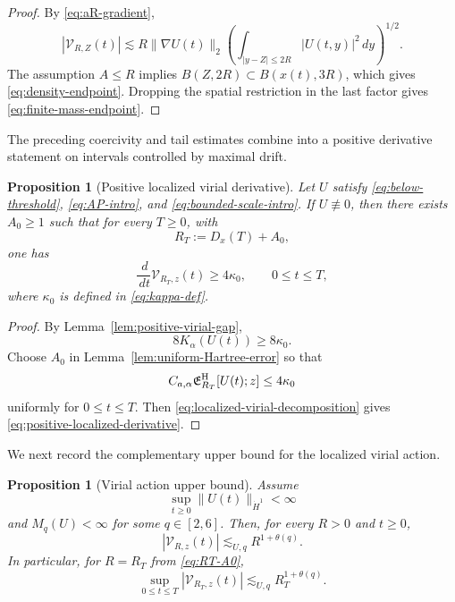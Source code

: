 \documentclass[preprint,12pt]{elsarticle}
\numberwithin{equation}{section}
\newtheorem{proposition}[theorem]{Proposition}
\theoremstyle{remark}
\newcommand{\dd}{\,d}
\newcommand{\Kcal}{K_{\alpha}}
\newcommand{\Vcal}{\mathcal V}
\begin{document}
\begin{proof}
By \eqref{eq:aR-gradient},
\[
 |\Vcal_{R,Z}(t)|
 \lesssim R\|\nabla U(t)\|_2
 \left(\int_{|y-Z|\le2R}|U(t,y)|^2\dd y\right)^{1/2}.
\]
The assumption $A\le R$ implies $B(Z,2R)\subset B(x(t),3R)$, which gives \eqref{eq:density-endpoint}. Dropping the spatial restriction in the last factor gives \eqref{eq:finite-mass-endpoint}.
\end{proof}

The preceding coercivity and tail estimates combine into a positive derivative statement on intervals controlled by maximal drift.

\begin{proposition}[Positive localized virial derivative]\label{prop:positive-virial-derivative}
Let $U$ satisfy \eqref{eq:below-threshold}, \eqref{eq:AP-intro}, and \eqref{eq:bounded-scale-intro}. If $U\not\equiv0$, then there exists $A_0\ge1$ such that for every $T\ge0$, with
\begin{equation}\label{eq:RT-A0}
  R_T:=D_x(T)+A_0,
\end{equation}
one has
\begin{equation}\label{eq:positive-localized-derivative}
  \frac{\dd}{\dd t}\Vcal_{R_T,z}(t)\ge4\kappa_0,
  \qquad 0\le t\le T,
\end{equation}
where $\kappa_0$ is defined in \eqref{eq:kappa-def}.
\end{proposition}

\begin{proof}
By Lemma~\ref{lem:positive-virial-gap},
\begin{equation*}
  8\Kcal(U(t))\ge8\kappa_0.
\end{equation*}
Choose $A_0$ in Lemma~\ref{lem:uniform-Hartree-error} so that
\begin{equation*}
  C_{a,\alpha}\mathfrak E_{R_T}^{\rm H}[U(t);z]\le4\kappa_0
\end{equation*}
uniformly for $0\le t\le T$. Then \eqref{eq:localized-virial-decomposition} gives \eqref{eq:positive-localized-derivative}.
\end{proof}

We next record the complementary upper bound for the localized virial action.

\begin{proposition}[Virial action upper bound]\label{prop:virial-action-bound}
Assume
\begin{equation*}
  \sup_{t\ge0}\|U(t)\|_{\dot H^1}<\infty
\end{equation*}
and $M_q(U)<\infty$ for some $q\in[2,6]$. Then, for every $R>0$ and $t\ge0$,
\begin{equation}\label{eq:action-upper-general}
  |\Vcal_{R,z}(t)|
  \lesssim_{U,q}R^{1+\theta(q)}.
\end{equation}
In particular, for $R=R_T$ from \eqref{eq:RT-A0},
\begin{equation}\label{eq:action-upper-RT}
  \sup_{0\le t\le T}|\Vcal_{R_T,z}(t)|
  \lesssim_{U,q}R_T^{1+\theta(q)}.
\end{equation}
\end{proposition}
\end{document}
